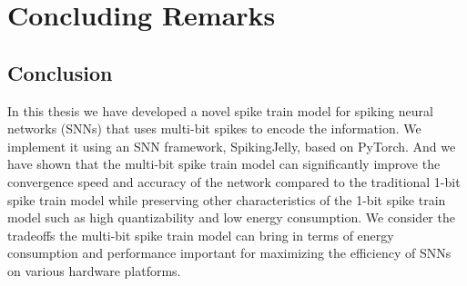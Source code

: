 \chapter{Concluding Remarks}
\label{chap:concluding_remarks}

    \section{Conclusion}
    \label{sec:conclusion}
        In this thesis we have developed a novel spike train model for spiking neural networks (SNNs) that uses multi-bit spikes to encode the information. We implement it using an SNN framework, SpikingJelly, based on PyTorch. And we have shown that the multi-bit spike train model can significantly improve the convergence speed and accuracy of the network compared to the traditional 1-bit spike train model while preserving other characteristics of the 1-bit spike train model such as high quantizability and low energy consumption. We consider the tradeoffs the multi-bit spike train model can bring in terms of energy consumption and performance important for maximizing the efficiency of SNNs on various hardware platforms.


